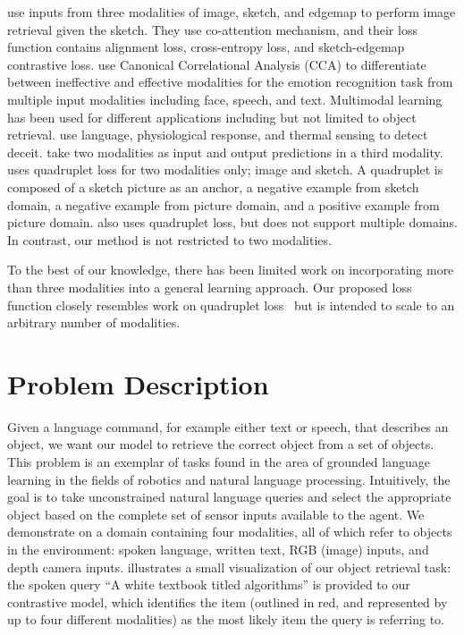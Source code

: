 \documentclass[sigconf,natbib=true,anonymous=true]{acmart}
\begin{document}
\citet{semihet_three_way_Lei_2020} use inputs from three modalities of image, sketch, and edgemap to perform image retrieval given the sketch. They use co-attention mechanism, and their loss function contains alignment loss, cross-entropy loss, and sketch-edgemap contrastive loss. \citet{Mittal2020M3ER} use Canonical Correlational Analysis (CCA) to differentiate between ineffective and effective modalities for the emotion recognition task from multiple input modalities including face, speech, and text. Multimodal learning has been used for different applications including but not limited to object retrieval. \citet{Deception_ICMI_2014} use language, physiological response, and thermal sensing to detect deceit. \citet{het_data_fusion_liu_IEEE_2017} take two modalities as input and output predictions in a third modality. \citet{tursun2021efficient} uses quadruplet loss for two modalities only; image and sketch. A quadruplet is composed of a sketch picture as an anchor, a negative example from sketch domain, a negative example from picture domain,  and a positive example from picture domain. \citet{chen2017beyond} also uses quadruplet loss, but does not support multiple domains. In contrast, our method is not restricted to two modalities.

To the best of our knowledge, there has been limited work on incorporating more than three modalities into a general learning approach. Our proposed loss function closely resembles work on quadruplet loss~\cite{chen2017beyond,tursun2021efficient} but is intended to scale to an arbitrary number of modalities.


\section{Problem Description}
\label{sec:Problem-Description}

Given a language command, for example either text or speech, that describes an object, we want our model to retrieve the correct object from a set of objects. This problem is an exemplar of tasks found in the area of grounded language learning in the fields of robotics and natural  language processing. Intuitively, the goal is to take unconstrained natural language queries and select the appropriate object based on the complete set of sensor inputs available to the agent. We demonstrate on a domain containing four modalities, all of which refer to objects in the environment: spoken language, written text, RGB (image) inputs, and depth camera inputs.  illustrates a small visualization of our object retrieval task: the spoken query ``A white textbook titled algorithms'' is provided to our contrastive model, which identifies the item (outlined in red, and represented by up to four different modalities) as the most likely item the query is referring to.
\end{document}
